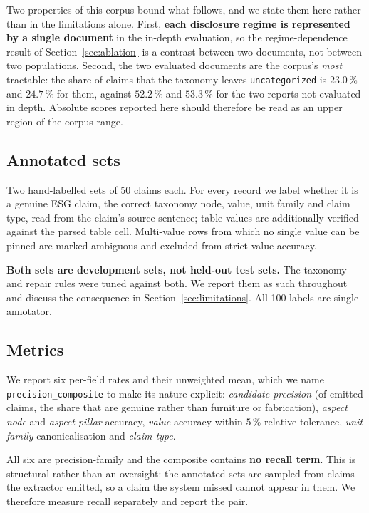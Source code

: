 \documentclass[3p,times]{elsarticle}
\begin{document}
Two properties of this corpus bound what follows, and we state them here rather
than in the limitations alone. First, \textbf{each disclosure regime is
represented by a single document} in the in-depth evaluation, so the
regime-dependence result of Section~\ref{sec:ablation} is a contrast between two
documents, not between two populations. Second, the two evaluated documents are
the corpus's \emph{most} tractable: the share of claims that the taxonomy leaves
\texttt{uncategorized} is $23.0\,\%$ and $24.7\,\%$ for them, against $52.2\,\%$
and $53.3\,\%$ for the two reports not evaluated in depth. Absolute scores
reported here should therefore be read as an upper region of the corpus range.

\subsection{Annotated sets}

Two hand-labelled sets of 50 claims each. For every record we label whether it is
a genuine ESG claim, the correct taxonomy node, value, unit family and claim
type, read from the claim's source sentence; table values are additionally
verified against the parsed table cell. Multi-value rows from which no single
value can be pinned are marked ambiguous and excluded from strict value accuracy.

\textbf{Both sets are development sets, not held-out test sets.} The taxonomy and
repair rules were tuned against both. We report them as such throughout and
discuss the consequence in Section~\ref{sec:limitations}. All 100 labels are
single-annotator.

\subsection{Metrics}

We report six per-field rates and their unweighted mean, which we name
\texttt{precision\_composite} to make its nature explicit: \emph{candidate
precision} (of emitted claims, the share that are genuine rather than furniture
or fabrication), \emph{aspect node} and \emph{aspect pillar} accuracy,
\emph{value} accuracy within $5\,\%$ relative tolerance, \emph{unit family}
canonicalisation and \emph{claim type}.

All six are precision-family and the composite contains \textbf{no recall term}.
This is structural rather than an oversight: the annotated sets are sampled from
claims the extractor emitted, so a claim the system missed cannot appear in them.
We therefore measure recall separately and report the pair.
\end{document}
